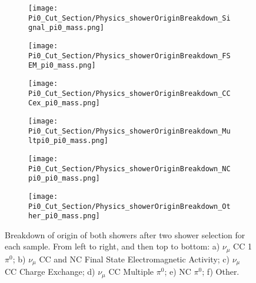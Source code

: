 \begin{figure}[H]
\centering
  \begin{subfigure}[t]{0.25\textwidth}
    \centering
\texttt{[image: Pi0\_Cut\_Section/Physics\_showerOriginBreakdown\_Signal\_pi0\_mass.png]}
  \caption{ }
  \end{subfigure} 
  \hspace{5mm}
  \begin{subfigure}[t]{0.25\textwidth}
    \centering
\texttt{[image: Pi0\_Cut\_Section/Physics\_showerOriginBreakdown\_FSEM\_pi0\_mass.png]}
  \caption{ }
  \end{subfigure} 
  \hspace{5mm}
  \begin{subfigure}[t]{0.25\textwidth}
    \centering
\texttt{[image: Pi0\_Cut\_Section/Physics\_showerOriginBreakdown\_CCCex\_pi0\_mass.png]}
  \caption{ }
  \end{subfigure} 
  \hspace{5mm}
  \begin{subfigure}[t]{0.25\textwidth}
    \centering
\texttt{[image: Pi0\_Cut\_Section/Physics\_showerOriginBreakdown\_Multpi0\_pi0\_mass.png]}
  \caption{ }
  \end{subfigure} 
  \hspace{5mm}
  \begin{subfigure}[t]{0.25\textwidth}
    \centering
\texttt{[image: Pi0\_Cut\_Section/Physics\_showerOriginBreakdown\_NCpi0\_pi0\_mass.png]}
  \caption{ }
  \end{subfigure} 
  \hspace{5mm}
  \begin{subfigure}[t]{0.25\textwidth}
    \centering
\texttt{[image: Pi0\_Cut\_Section/Physics\_showerOriginBreakdown\_Other\_pi0\_mass.png]}
  \caption{ }
  \end{subfigure} 
\caption{ Breakdown of origin of both showers after two shower selection for each sample.  From left to right, and then top to bottom: a) $\nu_{\mu}$ CC 1 $\pi^0$; b) $\nu_\mu$ CC and NC Final State Electromagnetic Activity; c) $\nu_{\mu}$ CC Charge Exchange; d) $\nu_\mu$ CC Multiple $\pi^0$; e) NC $\pi^0$; f) Other.  }

\label{fig:physics_showerOriginBreakdown_mass}
\end{figure}



